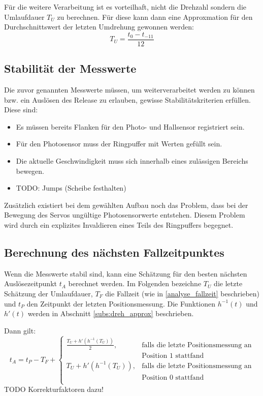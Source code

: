 Für die weitere Verarbeitung ist es vorteilhaft, nicht die Drehzahl sondern die Umlaufdauer $T_U$ zu berechnen.
Für diese kann dann eine Approxmation für den Durchschnittswert der letzten Umdrehung gewonnen werden:
\begin{equation*}
T_U = \frac{t_0 - t_{-11}}{12}
\end{equation*}

\subsection{Stabilität der Messwerte}\label{design_stabilitaet}
Die zuvor genannten Messwerte müssen, um weiterverarbeitet werden zu können bzw. ein Auslösen des Release zu erlauben, gewisse Stabilitätskriterien erfüllen.
Diese sind:
\begin{itemize}
	\item Es müssen bereits Flanken für den Photo- und Hallsensor registriert sein.
	\item Für den Photosensor muss der Ringpuffer mit Werten gefüllt sein.
	\item Die aktuelle Geschwindigkeit muss sich innerhalb eines zulässigen Bereichs bewegen.
	\item TODO: Jumps (Scheibe festhalten)
\end{itemize}

Zusätzlich existiert bei dem gewählten Aufbau noch das Problem, dass bei der Bewegung des Servos ungültige Photosensorwerte entstehen.
Diesem Problem wird durch ein explizites Invaldieren eines Teils des Ringpuffers begegnet.

\subsection{Berechnung des nächsten Fallzeitpunktes}\label{design_zeitpunkt}
Wenn die Messwerte stabil sind, kann eine Schätzung für den besten nächsten Auslösezeitpunkt $t_A$ berechnet werden.
Im Folgenden bezeichne $T_U$ die letzte Schätzung der Umlaufdauer, $T_F$ die Fallzeit (wie in \cref{analyse_fallzeit} beschrieben) und $t_P$ den Zeitpunkt der letzten Positionsmessung.
Die Funktionen $h^{-1}(t)$ und $h'(t)$ werden in Abschnitt \ref{subs:dreh_approx} beschrieben.

Dann gilt:
\begin{equation*}
t_A = t_P - T_F +
\begin{cases}
	\frac{T_U + h'(h^{-1}(T_U))}{2} , & \text{falls die letzte Positionsmessung an}\\
	&  \text{Position 1 stattfand}\\
	T_U + h'(h^{-1}(T_U)), & \text{falls die letzte Positionsmessung an}\\
	&  \text{Position 0 stattfand}\\

\end{cases}
\end{equation*}
TODO Korrekturfaktoren dazu!

